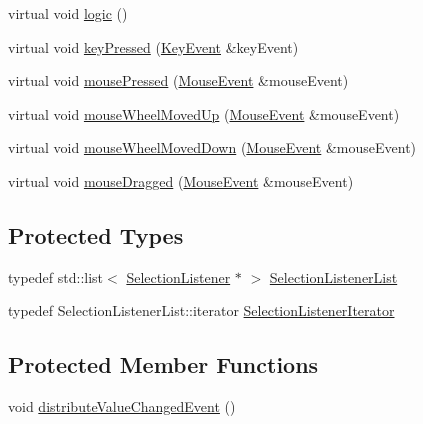 \begin{DoxyCompactItemize}
\item 
virtual void \hyperlink{classgcn_1_1ListBox_af12e558e328108e5a3d10acac88db34b}{logic} ()
\item 
virtual void \hyperlink{classgcn_1_1ListBox_acd4c9c50bf08ff421a77884b62a8d94b}{key\+Pressed} (\hyperlink{classgcn_1_1KeyEvent}{Key\+Event} \&key\+Event)
\item 
virtual void \hyperlink{classgcn_1_1ListBox_a7315501efa4c1b56176314f5ebd0f46d}{mouse\+Pressed} (\hyperlink{classgcn_1_1MouseEvent}{Mouse\+Event} \&mouse\+Event)
\item 
virtual void \hyperlink{classgcn_1_1ListBox_af13583e4b6bb305a3d5a495aa2ec984b}{mouse\+Wheel\+Moved\+Up} (\hyperlink{classgcn_1_1MouseEvent}{Mouse\+Event} \&mouse\+Event)
\item 
virtual void \hyperlink{classgcn_1_1ListBox_ab381e680bde82a0fa114a962735a4abe}{mouse\+Wheel\+Moved\+Down} (\hyperlink{classgcn_1_1MouseEvent}{Mouse\+Event} \&mouse\+Event)
\item 
virtual void \hyperlink{classgcn_1_1ListBox_ab9f0c4144e97bf1f394b76c38dd5307c}{mouse\+Dragged} (\hyperlink{classgcn_1_1MouseEvent}{Mouse\+Event} \&mouse\+Event)
\end{DoxyCompactItemize}
\subsection*{Protected Types}
\begin{DoxyCompactItemize}
\item 
typedef std\+::list$<$ \hyperlink{classgcn_1_1SelectionListener}{Selection\+Listener} $\ast$ $>$ \hyperlink{classgcn_1_1ListBox_aa44c39772de49bdc05368b7cc319d595}{Selection\+Listener\+List}
\item 
typedef Selection\+Listener\+List\+::iterator \hyperlink{classgcn_1_1ListBox_ad4eec42ff931f3d0893425f7eccb7923}{Selection\+Listener\+Iterator}
\end{DoxyCompactItemize}
\subsection*{Protected Member Functions}
\begin{DoxyCompactItemize}
\item 
void \hyperlink{classgcn_1_1ListBox_af6028c7d3f7247a75e48fef800933a3a}{distribute\+Value\+Changed\+Event} ()
\end{DoxyCompactItemize}

